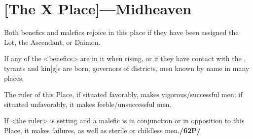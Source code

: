 \section{[The X Place]---Midheaven}

Both benefics and malefics rejoice in this place if they have been assigned the Lot, the Ascendant, or Daimon. 

If any of the <benefics> are in it when rising, or if they have contact with the \Moon, tyrants and kin[g]s are born, governors of districts, men known by name in many places. 

The ruler of this Place, if situated favorably, makes vigorous/successful men; if situated unfavorably, it makes feeble/unsuccessful men. 

If <the ruler> is setting and a malefic is in conjunction or in opposition to this Place, it makes failures, as well as sterile or childless men.\textbf{/62P/}

\newpage